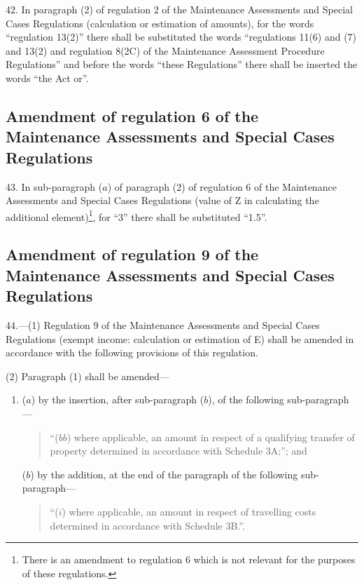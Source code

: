 \documentclass[a4paper]{article}
\begin{document}
42.  In paragraph (2) of regulation 2 of the Maintenance Assessments and Special Cases Regulations (calculation or estimation of amounts), for the words “regulation 13(2)” there shall be substituted the words “regulations 11(6) and (7) and 13(2) and regulation 8(2C) of the Maintenance Assessment Procedure Regulations” and before the words “these Regulations” there shall be inserted the words “the Act or”.

\subsection[43. Amendment of regulation 6 of the Maintenance Assessments and Special Cases Regulations]{Amendment of regulation 6 of the Maintenance Assessments and Special Cases Regulations}

43.  In sub-paragraph ($a$) of paragraph (2) of regulation 6 of the Maintenance Assessments and Special Cases Regulations (value of Z in calculating the additional element)\footnote{\frenchspacing There is an amendment to regulation 6 which is not relevant for the purposes of these regulations.}, for “3” there shall be substituted “1.5”.

\subsection[44. Amendment of regulation 9 of the Maintenance Assessments and Special Cases Regulations]{Amendment of regulation 9 of the Maintenance Assessments and Special Cases Regulations}

44.—(1) Regulation 9 of the Maintenance Assessments and Special Cases Regulations (exempt income: calculation or estimation of E) shall be amended in accordance with the following provisions of this regulation.

(2) Paragraph (1) shall be amended—
\begin{enumerate}\item[]
($a$) by the insertion, after sub-paragraph ($b$), of the following sub-\hspace{0pt}paragraph—
\begin{quotation}
“($bb$) where applicable, an amount in respect of a qualifying transfer of property determined in accordance with Schedule 3A;”; and
\end{quotation}

($b$) by the addition, at the end of the paragraph of the following sub-paragraph—
\begin{quotation}
“($i$) where applicable, an amount in respect of travelling costs determined in accordance with Schedule 3B.”.
\end{quotation}
\end{enumerate}
\end{document}
